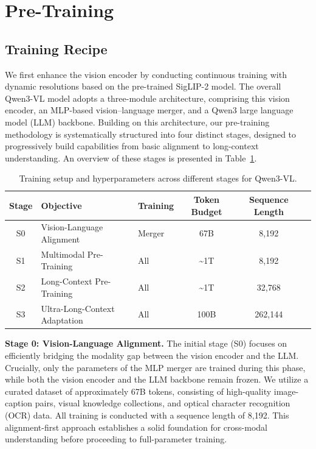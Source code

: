 \documentclass{article} %
\begin{document}
\section{Pre-Training}

\subsection{Training Recipe}
We first enhance the vision encoder by conducting continuous training with dynamic resolutions based on the pre-trained SigLIP-2 model. The overall Qwen3-VL model adopts a three-module architecture, comprising this vision encoder, an MLP-based vision–language merger, and a Qwen3 large language model (LLM) backbone. Building on this architecture, our pre-training methodology is systematically structured into four distinct stages, designed to progressively build capabilities from basic alignment to long-context understanding. An overview of these stages is presented in Table~\ref{tab:training_setup}.
\begin{table}[htbp]
\centering
\caption{Training setup and hyperparameters across different stages for Qwen3-VL.}
\label{tab:training_setup}
\begin{tabular}{@{}cllccc@{}}
\toprule
\textbf{Stage} & \textbf{Objective} & \textbf{Training} & \textbf{Token Budget} & \textbf{Sequence Length} \\ \midrule
S0 & Vision-Language Alignment & Merger & 67B & 8,192 \\
S1 & Multimodal Pre-Training & All & \textasciitilde 1T & 8,192 \\
S2 & Long-Context Pre-Training & All & \textasciitilde 1T & 32,768 \\
S3 & Ultra-Long-Context Adaptation & All & 100B & 262,144 \\ \bottomrule
\end{tabular}
\end{table}

\textbf{Stage 0: Vision-Language Alignment.} The initial stage (S0) focuses on efficiently bridging the modality gap between the vision encoder and the LLM. Crucially, only the parameters of the MLP merger are trained during this phase, while both the vision encoder and the LLM backbone remain frozen. We utilize a curated dataset of approximately 67B tokens, consisting of high-quality image-caption pairs, visual knowledge collections, and optical character recognition (OCR) data. All training is conducted with a sequence length of 8,192. This alignment-first approach establishes a solid foundation for cross-modal understanding before proceeding to full-parameter training.
\end{document}
